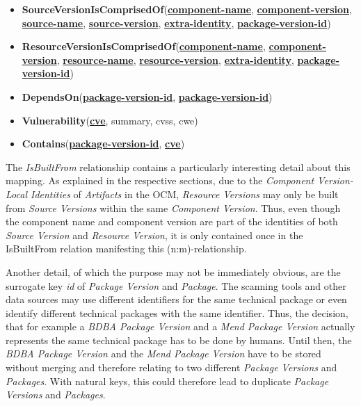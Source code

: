 \begin{itemize}
	\item \textbf{SourceVersionIsComprisedOf}(\textbf{\underline{component-name}}, \textbf{\underline{component-version}}, \textbf{\underline{source-name}}, \textbf{\underline{source-version}}, \textbf{\underline{extra-identity}}, \textbf{\underline{package-version-id}})
	\item \textbf{ResourceVersionIsComprisedOf}(\textbf{\underline{component-name}}, \textbf{\underline{component-version}}, \textbf{\underline{resource-name}}, \textbf{\underline{resource-version}}, \textbf{\underline{extra-identity}}, \textbf{\underline{package-version-id}})
	\item \textbf{DependsOn}(\textbf{\underline{package-version-id}}, \textbf{\underline{package-version-id}})
	\item \textbf{Vulnerability}(\textbf{\underline{cve}}, summary, cvss, cwe)
	\item \textbf{Contains}(\textbf{\underline{package-version-id}}, \textbf{\underline{cve}})
\end{itemize}

The \emph{IsBuiltFrom} relationship contains a particularly interesting detail about this mapping. As explained in the respective sections, due to the \emph{Component Version-Local Identities} of \emph{Artifacts} in the OCM, \emph{Resource Versions} may only be built from \emph{Source Versions} within the same \emph{Component Version}. Thus, even though the component name and component version are part of the identities of both \emph{Source Version} and \emph{Resource Version}, it is only contained once in the IsBuiltFrom relation manifesting this (n:m)-relationship.\par
Another detail, of which the purpose may not be immediately obvious, are the surrogate key \emph{id} of \emph{Package Version} and \emph{Package}. The scanning tools and other data sources may use different identifiers for the same technical package or even identify different technical packages with the same identifier. Thus, the decision, that for example a \emph{BDBA Package Version} and a \emph{Mend Package Version} actually represents the same technical package has to be done by humans. Until then, the \emph{BDBA Package Version} and the \emph{Mend Package Version} have to be stored without merging and therefore relating to two different \emph{Package Versions} and \emph{Packages}. With natural keys, this could therefore lead to duplicate \emph{Package Versions} and \emph{Packages}.

